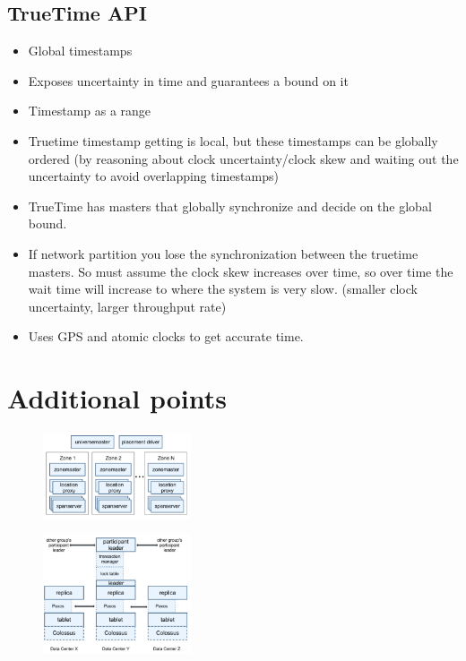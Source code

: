 \subsection{TrueTime API} 
\begin{itemize} 
    \item Global timestamps 
    \item Exposes uncertainty in time and guarantees a bound on it 
    \item Timestamp as a range 
    \item Truetime timestamp getting is local, but these timestamps can be globally ordered (by reasoning about clock uncertainty/clock skew and waiting out the uncertainty to avoid overlapping timestamps) 
    \item TrueTime has masters that globally synchronize and decide on the global bound. 
    \item If network partition you lose the synchronization between the truetime masters. So must assume the clock skew increases over time, so over time the wait time will increase to where the system is very slow. (smaller clock uncertainty, larger throughput rate) 
    \item Uses GPS and atomic clocks to get accurate time. 
\end{itemize} 

\section{Additional points} 

\begin{figure}
    \includegraphics[width=0.39\textwidth]{img/spanner_archi.png}
\end{figure}

\begin{figure}
    \includegraphics[width=0.39\textwidth]{img/spanner_system_diagram.png}
\end{figure}

